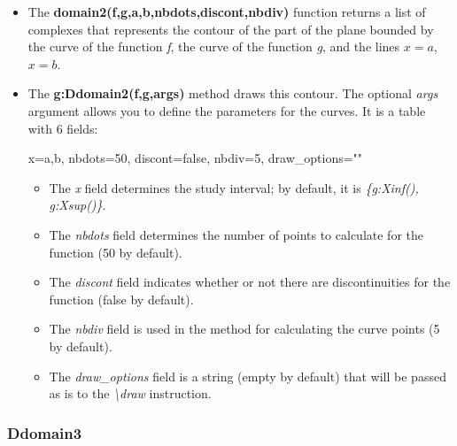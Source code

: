 \begin{itemize}
    \item The \textbf{domain2(f,g,a,b,nbdots,discont,nbdiv)} function returns a list of complexes that represents the contour of the part of the plane bounded by the curve of the function \emph{f}, the curve of the function \emph{g}, and the lines \(x=a\), \(x=b\).

    \item The \textbf{g:Ddomain2(f,g,args)} method draws this contour. The optional \emph{args} argument allows you to define the parameters for the curves. It is a table with 6 fields:

\begin{TeXcode}
{ x={a,b}, nbdots=50, discont=false, nbdiv=5, draw_options="" }
\end{TeXcode}

\begin{itemize}
    \item The \emph{x} field determines the study interval; by default, it is \emph{\{g:Xinf(), g:Xsup()\}}.
    \item The \emph{nbdots} field determines the number of points to calculate for the function (50 by default).
    \item The \emph{discont} field indicates whether or not there are discontinuities for the function (false by default).     \item The \emph{nbdiv} field is used in the method for calculating the curve points (5 by default).
    \item The \emph{draw\_options} field is a string (empty by default) that will be passed as is to the \emph{\textbackslash draw} instruction.
\end{itemize}
\end{itemize}

\subsubsection{Ddomain3}

